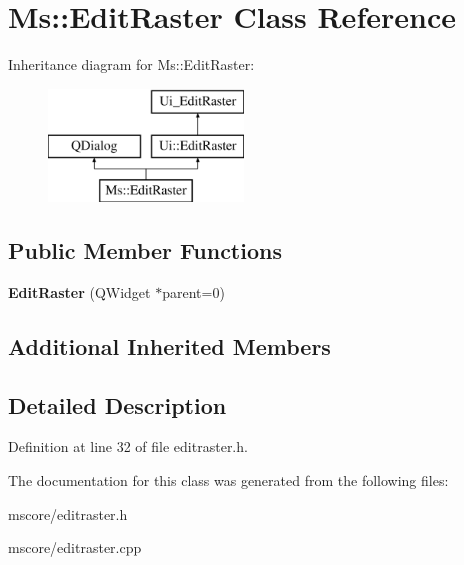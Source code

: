 \hypertarget{class_ms_1_1_edit_raster}{}\section{Ms\+:\+:Edit\+Raster Class Reference}
\label{class_ms_1_1_edit_raster}
Inheritance diagram for Ms\+:\+:Edit\+Raster\+:\begin{figure}[H]
\begin{center}
\leavevmode
\includegraphics[height=3.000000cm]{class_ms_1_1_edit_raster}
\end{center}
\end{figure}
\subsection*{Public Member Functions}
\begin{DoxyCompactItemize}
\item 
\mbox{\label{class_ms_1_1_edit_raster_acbae695bc0bec88abf3f003c7a315b78}} 
{\bfseries Edit\+Raster} (Q\+Widget $\ast$parent=0)
\end{DoxyCompactItemize}
\subsection*{Additional Inherited Members}


\subsection{Detailed Description}


Definition at line 32 of file editraster.\+h.



The documentation for this class was generated from the following files\+:\begin{DoxyCompactItemize}
\item 
mscore/editraster.\+h\item 
mscore/editraster.\+cpp\end{DoxyCompactItemize}
